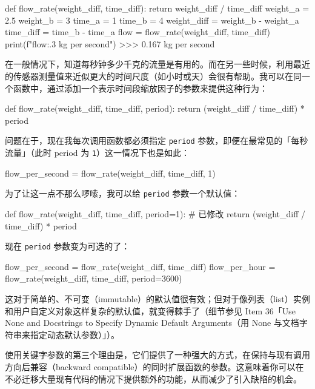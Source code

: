 \begin{codebox}[python]
def flow_rate(weight_diff, time_diff):
    return weight_diff / time_diff
weight_a = 2.5
weight_b = 3
time_a = 1
time_b = 4
weight_diff = weight_b - weight_a
time_diff = time_b - time_a
flow = flow_rate(weight_diff, time_diff)
print(f"{flow:.3} kg per second")
>>>
0.167 kg per second
\end{codebox}

在一般情况下，知道每秒钟多少千克的流量是有用的。而在另一些时候，利用最近的传感器测量值来近似更大的时间尺度（如小时或天）会很有帮助。我可以在同一个函数中，通过添加一个表示时间段缩放因子的参数来提供这种行为：

\begin{codebox}[python]
def flow_rate(weight_diff, time_diff, period):
    return (weight_diff / time_diff) * period
\end{codebox}

问题在于，现在我每次调用函数都必须指定 \texttt{period} 参数，即便在最常见的「每秒流量」（此时 period 为 \texttt{1}）这一情况下也是如此：

\begin{codebox}[python]
flow_per_second = flow_rate(weight_diff, time_diff, 1)
\end{codebox}

为了让这一点不那么啰嗦，我可以给 \texttt{period} 参数一个默认值：

\begin{codebox}[python]
def flow_rate(weight_diff, time_diff, period=1):  # 已修改
    return (weight_diff / time_diff) * period
\end{codebox}

现在 \texttt{period} 参数变为可选的了：

\begin{codebox}[python]
flow_per_second = flow_rate(weight_diff, time_diff)
flow_per_hour = flow_rate(weight_diff, time_diff, period=3600)
\end{codebox}

这对于简单的、不可变（immutable）的默认值很有效；但对于像列表（list）实例和用户自定义对象这样复杂的默认值，就变得棘手了（细节参见 Item 36「Use None and Docstrings to Specify Dynamic Default Arguments（用 None 与文档字符串来指定动态默认参数）」）。

使用关键字参数的第三个理由是，它们提供了一种强大的方式，在保持与现有调用方向后兼容（backward compatible）的同时扩展函数的参数。这意味着你可以在不必迁移大量现有代码的情况下提供额外的功能，从而减少了引入缺陷的机会。

